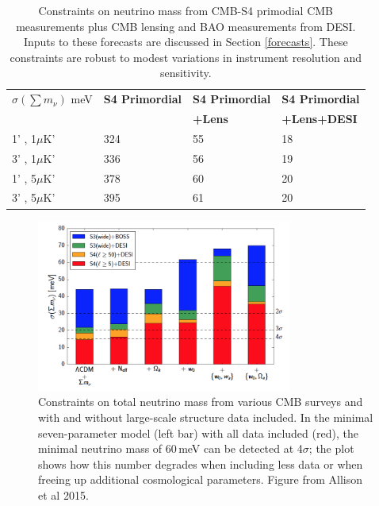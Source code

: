 \begin{table}[htbp]
\centering
\caption{Constraints on neutrino mass from CMB-S4 primodial CMB measurements plus CMB lensing and BAO measurements from DESI.  Inputs to these forecasts are discussed in Section \ref{forecasts}.  These constraints are robust to modest variations in instrument resolution and sensitivity.\vspace{0.2cm}}
\label{neutrinoTable}
\begin{tabular}{|l|l|l|l|}
\hline
$\sigma(\sum m_{\nu})$ meV & \textbf{S4 Primordial} & \textbf{S4 Primordial} & \textbf{S4 Primordial} \\
&                         &  \textbf{+Lens} & \textbf{+Lens+DESI} \\ \hline
1' , 1$\mu$K'              & 324         & 55               & 18                    \\ \hline
3' , 1$\mu$K'              & 336         & 56               & 19                    \\ \hline
1' , 5$\mu$K'              & 378         & 60               & 20                    \\ \hline
3' , 5$\mu$K'              & 395         & 61               & 20                    \\ \hline
\end{tabular}
\end{table}


\begin{figure}[htbp]
\centering
\includegraphics[width=0.75\textwidth]{CMBLensing/Allisonetal.png}
\caption{Constraints on total neutrino mass from various CMB surveys  and with and without large-scale structure data included.   In the minimal seven-parameter model (left bar) with all data included (red), the minimal neutrino mass of 60\,meV can be detected at 4$\sigma$; the plot shows how this number degrades when including less data or when freeing up additional cosmological parameters. Figure from Allison et al 2015.} 
\label{nuForecasts}
\end{figure}




